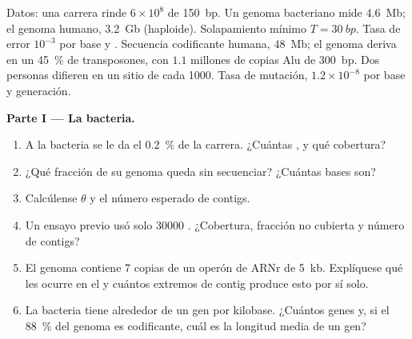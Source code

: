\begin{problem}
\label{pb:b3:genomics:1}
Datos: una carrera rinde $6\times 10^{8}$  de \qty{150}{bp}. Un
genoma bacteriano mide \qty{4.6}{Mb}; el genoma humano, \qty{3.2}{Gb}
(haploide). Solapamiento mínimo $T = \qty{30}{bp}$. Tasa de error
$10^{-3}$ por base y . Secuencia codificante humana, \qty{48}{Mb};
el genoma deriva en un \qty{45}{\%} de transposones, con $1.1$ millones
de copias Alu de \qty{300}{bp}. Dos personas difieren en un sitio de cada
\num{1000}. Tasa de mutación, $1.2\times 10^{-8}$ por base y generación.

\medskip
\noindent\textbf{Parte I --- La bacteria.}
\begin{enumerate}
  \item A la bacteria se le da el \qty{0.2}{\%} de la carrera. ¿Cuántas
        , y qué cobertura?
  \item ¿Qué fracción de su genoma queda sin secuenciar? ¿Cuántas bases
        son?
  \item Calcúlense $\theta$ y el número esperado de contigs.
  \item Un ensayo previo usó solo \num{30000} . ¿Cobertura,
        fracción no cubierta y número de contigs?
  \item El genoma contiene \num{7} copias de un operón de ARNr de
        \qty{5}{kb}. Explíquese qué les ocurre en el  y
        cuántos extremos de contig produce esto por sí solo.
  \item La bacteria tiene alrededor de un gen por kilobase. ¿Cuántos
        genes y, si el \qty{88}{\%} del genoma es codificante, cuál es
        la longitud media de un gen?
\end{enumerate}


\end{problem}
